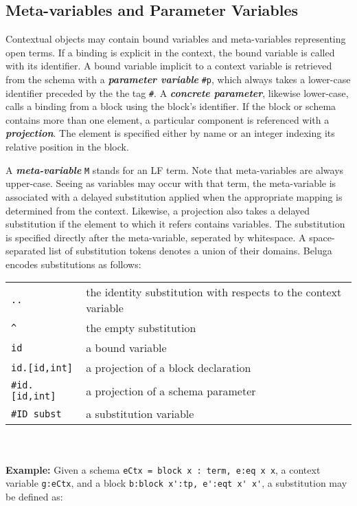 \documentclass[11pt]{article}
\begin{document}
\subsection{Meta-variables and Parameter Variables}
Contextual objects may contain bound variables and meta-variables representing open terms.
If a binding is explicit in the context, the bound variable is called with its identifier.
A bound variable implicit to a context variable is retrieved from the schema with a \textit{\textbf{parameter variable}} \verb+#p+, which always takes a lower-case identifier preceded by the the tag \verb+#+.
A \textit{\textbf{concrete parameter}}, likewise lower-case, calls a binding from a block using the block's identifier.
If the block or schema contains more than one element, a particular component is referenced with a \textbf{\textit{projection}}.
The element is specified either by name or an integer indexing its relative position in the block.

A \textit{\textbf{meta-variable}} \verb+M+ stands for an LF term.
Note that meta-variables are always upper-case.
Seeing as variables may occur with that term, the meta-variable is associated with a delayed substitution applied when the appropriate mapping is determined from the context.
Likewise, a projection also takes a delayed substitution if the element to which it refers contains variables.
The substitution is specified directly after the meta-variable, seperated by whitespace.
A space-separated list of substitution tokens denotes a union of their domains.
Beluga encodes substitutions as follows: \\

\begin{tabular}{ | l l}
\verb+..+ & the identity substitution with respects to the context variable\\
\verb+^+ & the empty substitution\\
\verb+id+ & a bound variable\\
\verb+id.[id,int]+ & a projection of a block declaration\\
\verb+#id.[id,int]+ & a projection of a schema parameter\\
\verb+#ID subst+ & a substitution variable\\
\end{tabular}\\
\\

\textbf{Example:} Given a schema \verb+eCtx = block x : term, e:eq x x+, a context variable \verb+g:eCtx+, and a block \verb+b:block x':tp, e':eqt x' x'+, a substitution may be defined as:
\end{document}
